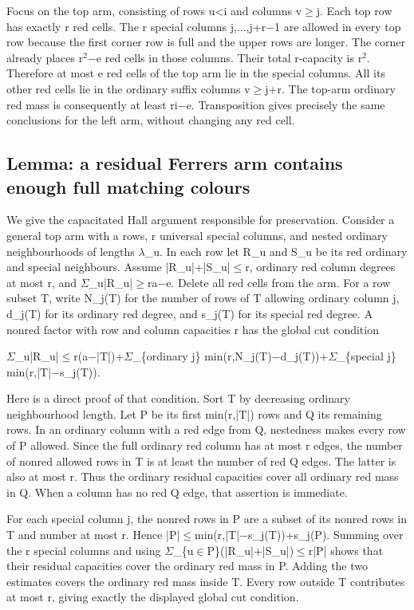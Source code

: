 \documentclass[11pt,a4paper]{article}
\begin{document}
Focus on the top arm, consisting of rows u<i and columns v\ensuremath{\geq}j. Each top row has exactly r red cells. The r special columns j,...,j+r\ensuremath{-}1 are allowed in every top row because the first corner row is full and the upper rows are longer. The corner already places r\ensuremath{^2}\ensuremath{-}e red cells in those columns. Their total r-capacity is r\ensuremath{^2}. Therefore at most e red cells of the top arm lie in the special columns. All its other red cells lie in the ordinary suffix columns v\ensuremath{\geq}j+r. The top-arm ordinary red mass is consequently at least ri\ensuremath{-}e. Transposition gives precisely the same conclusions for the left arm, without changing any red cell.

\subsection{Lemma: a residual Ferrers arm contains enough full matching colours}
We give the capacitated Hall argument responsible for preservation. Consider a general top arm with a rows, r universal special columns, and nested ordinary neighbourhoods of lengths \ensuremath{\lambda}\_u. In each row let R\_u and S\_u be its red ordinary and special neighbours. Assume |R\_u|+|S\_u|\ensuremath{\leq}r, ordinary red column degrees at most r, and \ensuremath{\Sigma}\_u|R\_u|\ensuremath{\geq}ra\ensuremath{-}e. Delete all red cells from the arm. For a row subset T, write N\_j(T) for the number of rows of T allowing ordinary column j, d\_j(T) for its ordinary red degree, and s\_j(T) for its special red degree. A nonred factor with row and column capacities r has the global cut condition

\ensuremath{\Sigma}\_u|R\_u|\ensuremath{\leq}r(a\ensuremath{-}|T|)+\ensuremath{\Sigma}\_\{ordinary j\} min(r,N\_j(T)\ensuremath{-}d\_j(T))+\ensuremath{\Sigma}\_\{special j\} min(r,|T|\ensuremath{-}s\_j(T)).

Here is a direct proof of that condition. Sort T by decreasing ordinary neighbourhood length. Let P be its first min(r,|T|) rows and Q its remaining rows. In an ordinary column with a red edge from Q, nestedness makes every row of P allowed. Since the full ordinary red column has at most r edges, the number of nonred allowed rows in T is at least the number of red Q edges. The latter is also at most r. Thus the ordinary residual capacities cover all ordinary red mass in Q. When a column has no red Q edge, that assertion is immediate.

For each special column j, the nonred rows in P are a subset of its nonred rows in T and number at most r. Hence |P|\ensuremath{\leq}min(r,|T|\ensuremath{-}s\_j(T))+s\_j(P). Summing over the r special columns and using \ensuremath{\Sigma}\_\{u\ensuremath{\in}P\}(|R\_u|+|S\_u|)\ensuremath{\leq}r|P| shows that their residual capacities cover the ordinary red mass in P. Adding the two estimates covers the ordinary red mass inside T. Every row outside T contributes at most r, giving exactly the displayed global cut condition.
\end{document}
